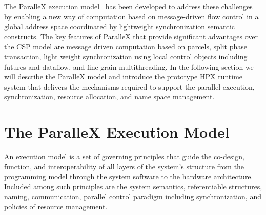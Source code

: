 \documentclass{revtex4}
\begin{document}
  The ParalleX execution model~\cite{scaling_impaired_apps} has been developed to address these challenges by 
enabling a new way of computation based on message-driven flow control in a 
global address space coordinated by lightweight synchronization semantic constructs.
The key features of ParalleX that provide significant advantages over the CSP model
are message driven computation based on parcels, split phase transaction, 
light weight synchronization using local control objects including futures and dataflow,
and fine grain multithreading.
In the following section we will describe the ParalleX model and introduce the prototype
HPX runtime system that delivers the mechanisms required to support the parallel execution, 
synchronization, resource allocation, and name space management. 

\section{The ParalleX Execution Model}
\label{sec:hpx}

An execution model is a set of governing principles
that guide the co-design, function, and interoperability of all layers
of the system's structure from the programming model through the
system software to the hardware architecture.  Included among such 
principles are the system semantics, referentiable structures, 
naming, communication, parallel control paradigm including synchronization, 
and policies of resource management.
\end{document}
